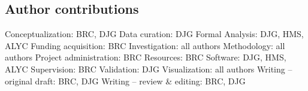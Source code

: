 \documentclass[9pt,biorxiv,lineno,onehalfspacing]{lapreprint}
\begin{document}
\begin{refsection}
\newpage
\section{Author contributions}



Conceptualization: BRC, DJG\newline
Data curation: DJG\newline
Formal Analysis: DJG, HMS, ALYC\newline
Funding acquisition: BRC\newline
Investigation: all authors\newline
Methodology: all authors\newline
Project administration: BRC\newline
Resources: BRC\newline
Software: DJG, HMS, ALYC\newline
Supervision: BRC\newline
Validation: DJG\newline
Visualization: all authors\newline
Writing – original draft: BRC, DJG\newline
Writing – review \& editing: BRC, DJG\newline


\clearpage
\printbibliography[title=Main Text References]
\end{refsection}

\if@endfloat\clearpage\processdelayedfloats\clearpage\fi 
\end{document}
